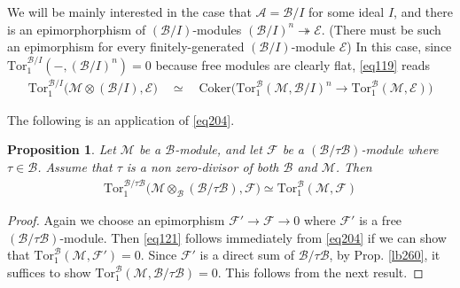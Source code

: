 \documentclass[12pt,b5paper,notitlepage]{report}
\theoremstyle{definition}
\theoremstyle{plain}
\newtheorem{pp}[df]{Proposition}
\newcommand{\mc}{\mathcal}
\newcommand{\Cok}{\mathrm{Coker}}
\newcommand{\Tor}{\mathrm{Tor}}
\newcommand{\Mod}{\mathrm{Mod}}
\numberwithin{equation}{section}
\begin{document}
We will be mainly interested in the case that $\mc A=\mc B/I$ for some ideal $I$, and there is an epimorphorphism of $(\mc B/I)$-modules $(\mc B/I)^n\twoheadrightarrow\mc E$. (There must be such an epimorphism for every finitely-generated $(\mc B/I)$-module $\mc E$) In this case, since $\Tor_1^{\mc B/I}(-,(\mc B/I)^n)=0$ because free modules are clearly flat,  \eqref{eq119} reads
\begin{align}\label{eq204}
\Tor_1^{\mc B/I}\big(\mc M\otimes(\mc B/I),\mc E\big)\quad\simeq\quad \Cok\Big(\Tor_1^{\mc B}(\mc M,\mc B/I)^n\rightarrow\Tor_1^{\mc B}(\mc M,\mc E) \Big)
\end{align}




The following is an application of \eqref{eq204}.
\begin{comment}
\begin{pp}\label{lb272}
Fix a ring morphism $\mc B\rightarrow\mc A$. Choose $\mc E\in\Mod(\mc A)$ and $\mc M\in\Mod(\mc B)$. Then
\begin{align}
\Tor_1^{\mc B}(\mc M,\mc E)=0\qquad\Longrightarrow\qquad \Tor_1^{\mc A}(\mc M\otimes_{\mc B}\mc A,\mc E)=0
\end{align}
\end{pp}

\begin{proof}
Choose an epimorphism $\mc E'\twoheadrightarrow\mc E$ where $\mc E'$ is a free $\mc A$-module. The proposition follows immediately from \eqref{eq204}.
\end{proof}
\end{comment}








\begin{pp}\label{lb263}
Let $\mc M$ be a $\mc B$-module, and let $\mc F$ be a $(\mc B/\tau\mc B)$-module where $\tau\in\mc B$. Assume that $\tau$ is a non zero-divisor of both $\mc B$ and $\mc M$. Then
\begin{align}  \label{eq121}
\Tor_1^{\mc B/\tau\mc B}\big(\mc M\otimes_{\mc B}(\mc B/\tau\mc B),\mc F \big)\simeq\Tor_1^{\mc B}(\mc M,\mc F)
\end{align}
\end{pp}



\begin{proof}
Again we choose an epimorphism $\mc F'\rightarrow\mc F\rightarrow0$ where $\mc F'$ is a free $(\mc B/\tau\mc B)$-module. Then  \eqref{eq121} follows immediately from \eqref{eq204} if we can show that $\Tor_1^{\mc B}(\mc M,\mc F')=0$. Since $\mc F'$ is a direct sum of $\mc B/\tau\mc B$, by Prop. \ref{lb260}, it suffices to show $\Tor_1^{\mc B}(\mc M,\mc B/\tau\mc B)=0$. This follows from the next result.
\end{proof}
\end{document}
